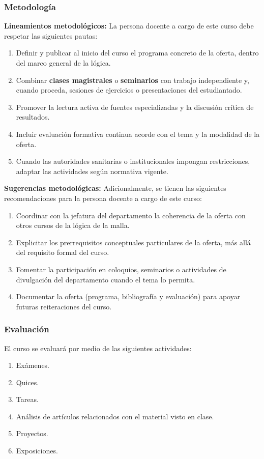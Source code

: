\begin{refsection}
\subsubsection*{Metodología}

\noindent \textbf{Lineamientos metodológicos:} La persona docente a cargo de este curso debe respetar las siguientes pautas:

\begin{enumerate}
    \item Definir y publicar al inicio del curso el programa concreto de la oferta, dentro del marco general de la lógica.
    \item Combinar \textbf{clases magistrales} o \textbf{seminarios} con trabajo independiente y, cuando proceda, sesiones de ejercicios o presentaciones del estudiantado.
    \item Promover la lectura activa de fuentes especializadas y la discusión crítica de resultados.
    \item Incluir evaluación formativa continua acorde con el tema y la modalidad de la oferta.
    \item Cuando las autoridades sanitarias o institucionales impongan restricciones, adaptar las actividades según normativa vigente.
\end{enumerate}

\textbf{Sugerencias metodológicas:} Adicionalmente, se tienen las siguientes recomendaciones para la persona docente a cargo de este curso:

\begin{enumerate}
    \item Coordinar con la jefatura del departamento la coherencia de la oferta con otros cursos de la lógica de la malla.
    \item Explicitar los prerrequisitos conceptuales particulares de la oferta, más allá del requisito formal del curso.
    \item Fomentar la participación en coloquios, seminarios o actividades de divulgación del departamento cuando el tema lo permita.
    \item Documentar la oferta (programa, bibliografía y evaluación) para apoyar futuras reiteraciones del curso.
\end{enumerate}

\subsubsection*{Evaluación}

El curso se evaluará por medio de las siguientes actividades:

\begin{enumerate}
\item Exámenes.
\item Quices.
\item Tareas.
\item Análisis de artículos relacionados con el material visto en clase.
\item Proyectos.
\item Exposiciones.
\end{enumerate}

\end{refsection}

